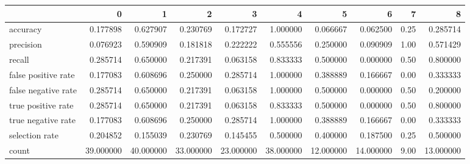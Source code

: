 \begin{tabular}{lrrrrrrrrr}
\toprule
{} &          0 &          1 &          2 &          3 &          4 &          5 &          6 &     7 &          8 \\
\midrule
accuracy            &   0.177898 &   0.627907 &   0.230769 &   0.172727 &   1.000000 &   0.066667 &   0.062500 &  0.25 &   0.285714 \\
precision           &   0.076923 &   0.590909 &   0.181818 &   0.222222 &   0.555556 &   0.250000 &   0.090909 &  1.00 &   0.571429 \\
recall              &   0.285714 &   0.650000 &   0.217391 &   0.063158 &   0.833333 &   0.500000 &   0.000000 &  0.50 &   0.800000 \\
false positive rate &   0.177083 &   0.608696 &   0.250000 &   0.285714 &   1.000000 &   0.388889 &   0.166667 &  0.00 &   0.333333 \\
false negative rate &   0.285714 &   0.650000 &   0.217391 &   0.063158 &   1.000000 &   0.500000 &   0.000000 &  0.50 &   0.200000 \\
true positive rate  &   0.285714 &   0.650000 &   0.217391 &   0.063158 &   0.833333 &   0.500000 &   0.000000 &  0.50 &   0.800000 \\
true negative rate  &   0.177083 &   0.608696 &   0.250000 &   0.285714 &   1.000000 &   0.388889 &   0.166667 &  0.00 &   0.333333 \\
selection rate      &   0.204852 &   0.155039 &   0.230769 &   0.145455 &   0.500000 &   0.400000 &   0.187500 &  0.25 &   0.500000 \\
count               &  39.000000 &  40.000000 &  33.000000 &  23.000000 &  38.000000 &  12.000000 &  14.000000 &  9.00 &  13.000000 \\
\bottomrule
\end{tabular}
